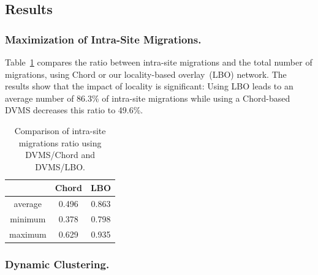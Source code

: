 \subsection{Results}

\subsubsection{Maximization of Intra-Site Migrations.}

Table~\ref{migration_table} compares the ratio between intra-site migrations and the total
number of migrations, using Chord or our locality-based overlay~(LBO) network. The results show that the impact of locality
is significant: Using LBO leads to an average number of 86.3\%
of intra-site migrations while using a Chord-based DVMS decreases this ratio to 49.6\%.

\begin{table}

  \begin{center}
    \begin{tabular}{|c|c|c|}   

      \hline \multicolumn{1}{|p{3cm}|}{ }
       & \multicolumn{1}{|p{3cm}|}{\centering Chord }  & \multicolumn{1}{|p{3cm}|}{ \centering LBO}  \\

      \hline
      average & 0.496 & 0.863 \\

      \hline
      minimum & 0.378 & 0.798 \\

      \hline
      maximum & 0.629 & 0.935 \\

      \hline
    \end{tabular}
  \end{center}
  \caption{\label{migration_table} Comparison of intra-site migrations ratio
    using DVMS/Chord and DVMS/LBO.}
  \vspace{-0.3cm}
\end{table}


\subsubsection{Dynamic Clustering.}

